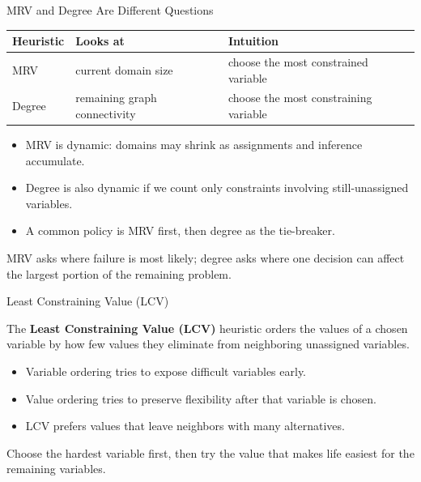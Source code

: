 \documentclass[aspectratio=169,10pt]{beamer}
\begin{document}
\begin{frame}[shrink=20]{MRV and Degree Are Different Questions}
  \begin{center}
  \renewcommand{\arraystretch}{1.40}
  \begin{tabular}{l|l|l}
    \textbf{Heuristic} & \textbf{Looks at} & \textbf{Intuition} \\\hline
    MRV & current domain size & choose the most constrained variable \\
    Degree & remaining graph connectivity & choose the most constraining variable
  \end{tabular}
  \end{center}

  \begin{itemize}
    \item MRV is dynamic: domains may shrink as assignments and inference accumulate.
    \item Degree is also dynamic if we count only constraints involving still-unassigned variables.
    \item A common policy is MRV first, then degree as the tie-breaker.
  \end{itemize}

  \begin{keyidea}
    MRV asks where failure is most likely; degree asks where one decision can affect the largest portion of the remaining problem.
  \end{keyidea}
\end{frame}

\begin{frame}[shrink=20]{Least Constraining Value (LCV)}
  \begin{cpdefinition}
    The \textbf{Least Constraining Value (LCV)} heuristic orders the values of a chosen variable by how few values they eliminate from neighboring unassigned variables.
  \end{cpdefinition}

  \begin{itemize}
    \item Variable ordering tries to expose difficult variables early.
    \item Value ordering tries to preserve flexibility after that variable is chosen.
    \item LCV prefers values that leave neighbors with many alternatives.
  \end{itemize}

  \begin{keyidea}
    Choose the hardest variable first, then try the value that makes life easiest for the remaining variables.
  \end{keyidea}
\end{frame}
\end{document}
